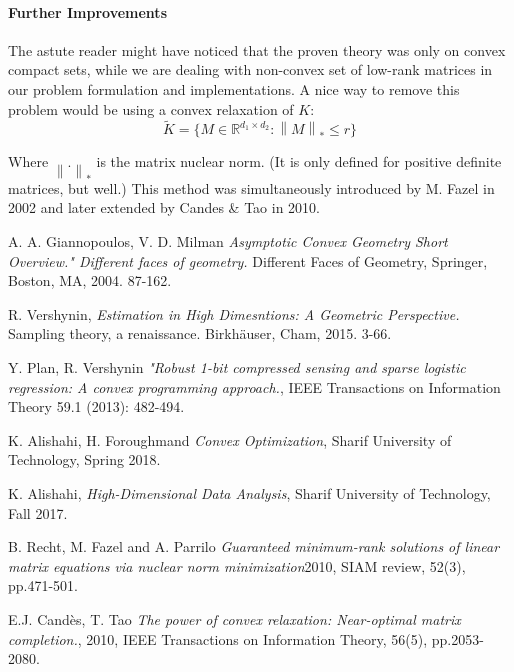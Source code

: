 \documentclass{amsart}
\theoremstyle{definition}
\theoremstyle{remark}
\numberwithin{equation}{section}
\newcommand\norm[1]{\left\lVert#1\right\rVert}
\begin{document}
\paragraph{Further Improvements} The astute reader might have noticed that the proven theory was only on convex compact sets, while we are dealing with non-convex set of low-rank matrices in our problem formulation and implementations. A nice way to remove this problem would be using a convex relaxation of $K$:
\[
\tilde{K}=\{ M \in \mathbb{R}^{d_1 \times d_2} : \norm{M}_* \leq r \}
\]


Where $\norm{.}_*$ is the matrix nuclear norm. (It is only defined for positive definite matrices, but well.) This method was simultaneously introduced by M. Fazel in 2002 and later extended by Candes \& Tao in 2010.


\begin{thebibliography}{10}

 A. A. Giannopoulos, V. D. Milman \textit{Asymptotic Convex Geometry Short Overview." Different faces of geometry.} Different Faces of Geometry, Springer,
Boston, MA, 2004. 87-162.

 R. Vershynin, \textit{Estimation in High Dimesntions: A Geometric Perspective.} Sampling theory, a renaissance. Birkhäuser, Cham, 2015. 3-66.

 Y. Plan, R. Vershynin \textit{"Robust 1-bit compressed sensing and sparse logistic regression: A convex programming
approach.}, IEEE Transactions on Information Theory 59.1 (2013): 482-494.

 K. Alishahi, H. Foroughmand \textit{Convex Optimization}, Sharif University of Technology, Spring 2018.

 K. Alishahi, \textit{High-Dimensional Data Analysis}, Sharif University of Technology, Fall 2017.

 B. Recht, M. Fazel and A. Parrilo \textit{Guaranteed minimum-rank solutions of linear matrix equations via nuclear norm minimization}2010, SIAM review, 52(3), pp.471-501.

 E.J. Candès, T. Tao \textit{The power of convex relaxation: Near-optimal matrix completion.}, 2010, IEEE Transactions on Information Theory, 56(5), pp.2053-2080.

\end{thebibliography}
\end{document}

